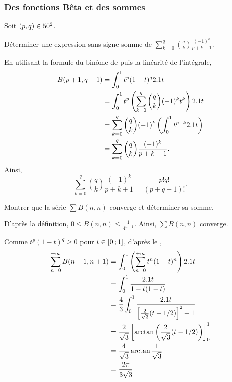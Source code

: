 \subsubsection{Des fonctions Bêta et des sommes}

\begin{exercice}
Soit $(p, q) \in 50^2$.

Déterminer une expression sans signe somme de $\sum\limits_{k=0}^q \binom{q}{k} \frac{(-1)^k}{p+k+1}$.
\end{exercice}

\begin{solution}
En utilisant la formule du binôme de  puis la linéarité de l'intégrale,
\begin{align*}
B(p+1, q+1)
&= \int_0^1 t^p (1 - t)^q 2.1 t\\
&= \int_0^1 t^p \left(\sum_{k=0}^q \binom{q}{k} (-1)^k t^k\right) 2.1 t\\
&= \sum_{k=0}^q \binom{q}{k} (-1)^k \left(\int_0^1 t^{p + k} 2.1 t\right)\\
&= \sum_{k=0}^q \binom{q}{k} \frac{(-1)^k}{p + k + 1}.
\end{align*}
Ainsi,
\[
\sum_{k=0}^q \binom{q}{k} \frac{(-1)^k}{p + k + 1}
= \frac{p! q!}{(p + q + 1)!}.
\]
\end{solution}


\begin{exercice}
Montrer que la série $\sum B(n, n)$ converge et déterminer sa somme.
\end{exercice}

\begin{solution}
D'après la définition, $0 \leqslant B(n, n) \leqslant \frac{1}{4^{n-1}}$. Ainsi, $\sum B(n, n)$ converge.

Comme $t^p (1 - t)^q \geqslant 0$ pour $t \in \left[0\,;1\right]$, d'après le ,
\begin{align*}
\sum_{n=0}^{+\infty} B(n+1, n+1)
&= \int_0^1 \left(\sum_{n=0}^{+\infty} t^n (1 - t)^n\right) 2.1 t \\
&= \int_0^1 \frac{2.1 t}{1 - t(1 - t)}\\
&= \frac{4}{3} \int_0^1 \frac{2.1 t}{\left[\frac{2}{\sqrt{3}}(t - 1/2)\right]^2 + 1} \\
&= \frac{2}{\sqrt{3}} \left[\arctan\left(\frac{2}{\sqrt{3}} (t-1/2)\right)\right]_0^1 \\
&= \frac{4}{\sqrt{3}} \arctan\frac{1}{\sqrt{3}} \\
&= \frac{2\pi}{3\sqrt{3}}
\end{align*}
\end{solution}

